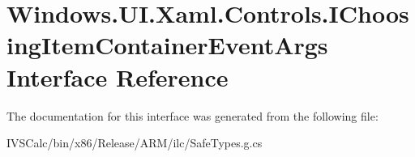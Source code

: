 \hypertarget{interface_windows_1_1_u_i_1_1_xaml_1_1_controls_1_1_i_choosing_item_container_event_args}{}\section{Windows.\+U\+I.\+Xaml.\+Controls.\+I\+Choosing\+Item\+Container\+Event\+Args Interface Reference}
\label{interface_windows_1_1_u_i_1_1_xaml_1_1_controls_1_1_i_choosing_item_container_event_args}


The documentation for this interface was generated from the following file\+:\begin{DoxyCompactItemize}
\item 
I\+V\+S\+Calc/bin/x86/\+Release/\+A\+R\+M/ilc/Safe\+Types.\+g.\+cs\end{DoxyCompactItemize}
